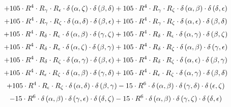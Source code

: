\begin{subequations}
\begin{gather}
 \\[0.2em] \notag 		 + 105 \cdot R^{4} \cdot R_{\gamma{}} \cdot R_{\epsilon{}} \cdot \delta{}\left(\alpha{}, \zeta{}\right) \cdot \delta{}\left(\beta{}, \delta{}\right)+ 105 \cdot R^{4} \cdot R_{\gamma{}} \cdot R_{\zeta{}} \cdot \delta{}\left(\alpha{}, \beta{}\right) \cdot \delta{}\left(\delta{}, \epsilon{}\right) 
 \\[0.2em] \notag 		 + 105 \cdot R^{4} \cdot R_{\gamma{}} \cdot R_{\zeta{}} \cdot \delta{}\left(\alpha{}, \delta{}\right) \cdot \delta{}\left(\beta{}, \epsilon{}\right)+ 105 \cdot R^{4} \cdot R_{\gamma{}} \cdot R_{\zeta{}} \cdot \delta{}\left(\alpha{}, \epsilon{}\right) \cdot \delta{}\left(\beta{}, \delta{}\right) 
 \\[0.2em] \notag 		 + 105 \cdot R^{4} \cdot R_{\delta{}} \cdot R_{\epsilon{}} \cdot \delta{}\left(\alpha{}, \beta{}\right) \cdot \delta{}\left(\gamma{}, \zeta{}\right)+ 105 \cdot R^{4} \cdot R_{\delta{}} \cdot R_{\epsilon{}} \cdot \delta{}\left(\alpha{}, \gamma{}\right) \cdot \delta{}\left(\beta{}, \zeta{}\right) 
 \\[0.2em] \notag 		 + 105 \cdot R^{4} \cdot R_{\delta{}} \cdot R_{\epsilon{}} \cdot \delta{}\left(\alpha{}, \zeta{}\right) \cdot \delta{}\left(\beta{}, \gamma{}\right)+ 105 \cdot R^{4} \cdot R_{\delta{}} \cdot R_{\zeta{}} \cdot \delta{}\left(\alpha{}, \beta{}\right) \cdot \delta{}\left(\gamma{}, \epsilon{}\right) 
 \\[0.2em] \notag 		 + 105 \cdot R^{4} \cdot R_{\delta{}} \cdot R_{\zeta{}} \cdot \delta{}\left(\alpha{}, \gamma{}\right) \cdot \delta{}\left(\beta{}, \epsilon{}\right)+ 105 \cdot R^{4} \cdot R_{\delta{}} \cdot R_{\zeta{}} \cdot \delta{}\left(\alpha{}, \epsilon{}\right) \cdot \delta{}\left(\beta{}, \gamma{}\right) 
 \\[0.2em] \notag 		 + 105 \cdot R^{4} \cdot R_{\epsilon{}} \cdot R_{\zeta{}} \cdot \delta{}\left(\alpha{}, \beta{}\right) \cdot \delta{}\left(\gamma{}, \delta{}\right)+ 105 \cdot R^{4} \cdot R_{\epsilon{}} \cdot R_{\zeta{}} \cdot \delta{}\left(\alpha{}, \gamma{}\right) \cdot \delta{}\left(\beta{}, \delta{}\right) 
 \\[0.2em] \notag 		 + 105 \cdot R^{4} \cdot R_{\epsilon{}} \cdot R_{\zeta{}} \cdot \delta{}\left(\alpha{}, \delta{}\right) \cdot \delta{}\left(\beta{}, \gamma{}\right)- 15 \cdot R^{6} \cdot \delta{}\left(\alpha{}, \beta{}\right) \cdot \delta{}\left(\gamma{}, \delta{}\right) \cdot \delta{}\left(\epsilon{}, \zeta{}\right) 
 \\[0.2em] \notag 		 - 15 \cdot R^{6} \cdot \delta{}\left(\alpha{}, \beta{}\right) \cdot \delta{}\left(\gamma{}, \epsilon{}\right) \cdot \delta{}\left(\delta{}, \zeta{}\right)- 15 \cdot R^{6} \cdot \delta{}\left(\alpha{}, \beta{}\right) \cdot \delta{}\left(\gamma{}, \zeta{}\right) \cdot \delta{}\left(\delta{}, \epsilon{}\right) 

\end{gather}
\end{subequations}
